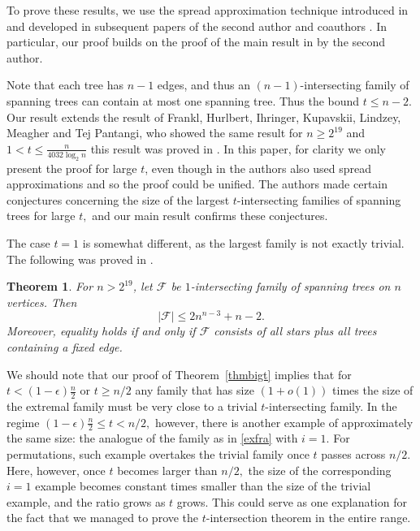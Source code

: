 \documentclass[11pt,letterpaper]{amsart}
\renewcommand{\le}{\leqslant}
\renewcommand{\ge}{\geqslant}
\newcommand{\ff}{\mathcal{F}}
\newtheorem{theorem}{Theorem}
\begin{document}
To prove these results, we use the spread approximation technique introduced in \cite{spreads} and developed in subsequent papers of the second author and coauthors \cite{Kup55, permutations, FKhr, Fedya}. In particular, our proof builds on the proof of the main result  in \cite{permutations} by the second author. 

Note that each tree has $n-1$ edges, and thus an $(n-1)$-intersecting family of spanning trees can contain at most one spanning tree. Thus the bound $t\le n-2.$ Our result extends the result of Frankl, Hurlbert, Ihringer, Kupavskii, Lindzey, Meagher and Tej Pantangi, who showed the same result for  $n \ge 2^{19}$ and $1 < t \leqslant \frac{n}{4032\log_2n}$ this result was proved in \cite{EKR_trees}. In this paper, for clarity we only present the proof for  large $t$, even though in \cite{EKR_trees} the authors also used spread approximations and so the proof could be unified. The authors made certain conjectures concerning the size of the largest $t$-intersecting families of spanning trees for large $t,$ and our main result  confirms these conjectures.


The case $t = 1$ is somewhat different, as the largest family is not exactly trivial. The following was proved in  \cite{EKR_trees}. 

\begin{theorem}\label{thmt1}
  For $n > 2^{19}$, let $\ff$ be $1$-intersecting family of spanning trees on $n$ vertices. Then $$|\ff| \le 2n^{n-3} + n - 2.$$ Moreover, equality holds if and only if $\ff$ consists of all stars plus all trees containing a fixed edge.
\end{theorem}

We should note that our proof of Theorem~\ref{thmbigt} implies that for $t<(1-\epsilon)\frac n2$ or $t\ge n/2$ any family that has size $(1+o(1))$ times the size of the extremal family must be very close to a trivial $t$-intersecting family. In the regime $(1-\epsilon)\frac n2\le t<n/2,$ however, there is another example of approximately the same size: the analogue of the family as in \eqref{exfra} with $i=1.$ For permutations, such example overtakes the trivial family once $t$ passes across $n/2.$ Here, however, once $t$ becomes larger than $n/2,$ the size of the corresponding $i=1$ example becomes constant times smaller than the size of the trivial example, and the ratio grows as $t$ grows. This could serve as one explanation for the fact that we managed to prove the $t$-intersection theorem in the entire range.
\end{document}
